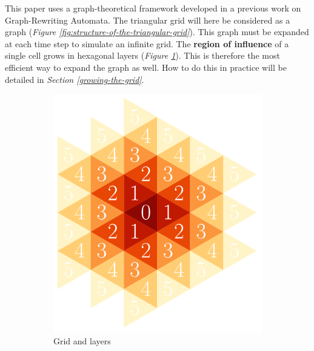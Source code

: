 \documentclass{article}
\begin{document}
This paper uses a graph-theoretical framework developed in a previous work on Graph-Rewriting Automata\cite{cousin2022organic}. The triangular grid will here be considered as a graph (\textit{Figure \ref{fig:structure-of-the-triangular-grid}}). This graph must be expanded at each time step to simulate an infinite grid. The \textbf{region of influence} of a single cell grows in hexagonal layers (\textit{Figure \ref{fig:layers}}). This is therefore the most efficient way to expand the graph as well. How to do this in practice will be detailed in \textit{Section \ref{growing-the-grid}}.

\begin{figure}[H]
     \centering
     \begin{subfigure}[b]{0.40\textwidth}
         \centering
         \includegraphics[width=\textwidth]{graphics/introduction/layers.pdf}
         \caption{Grid and layers}
         \label{fig:layers}
     \end{subfigure}
     \hspace{0.05\textwidth}
     \begin{subfigure}[b]{0.35\textwidth}
         \centering

\end{subfigure}
\end{figure}
\end{document}
